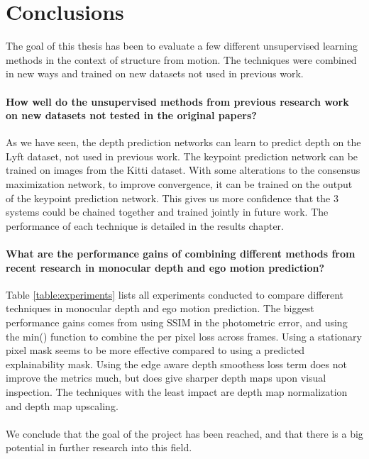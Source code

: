 \section{Conclusions}

The goal of this thesis has been to evaluate a few different unsupervised learning methods in the context of structure from motion. The techniques were combined in new ways and trained on new datasets not used in previous work.

\paragraph{\textbf{How well do the unsupervised methods from previous research work on new datasets not tested in the original papers?}} As we have seen, the depth prediction networks can learn to predict depth on the Lyft dataset, not used in previous work. The keypoint prediction network can be trained on images from the Kitti dataset. With some alterations to the consensus maximization network, to improve convergence, it can be trained on the output of the keypoint prediction network. This gives us more confidence that the 3 systems could be chained together and trained jointly in future work. The performance of each technique is detailed in the results chapter.

\paragraph{\textbf{What are the performance gains of combining different methods from recent research in monocular depth and ego motion prediction?}} Table \ref{table:experiments} lists all experiments conducted to compare different techniques in monocular depth and ego motion prediction. The biggest performance gains comes from using SSIM in the photometric error, and using the min() function to combine the per pixel loss across frames. Using a stationary pixel mask seems to be more effective compared to using a predicted explainability mask. Using the edge aware depth smoothess loss term does not improve the metrics much, but does give sharper depth maps upon visual inspection. The techniques with the least impact are depth map normalization and depth map upscaling.
\\
\\
We conclude that the goal of the project has been reached, and that there is a big potential in further research into this field.